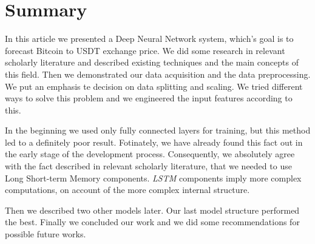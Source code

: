 \documentclass[conference]{IEEEtran}
\begin{document}
\section{Summary}

In this article we presented a Deep Neural Network system, which's goal is to forecast Bitcoin to USDT exchange price. We did some research in relevant scholarly literature and described existing techniques and the main concepts of this field. Then we demonstrated our data acquisition and the data preprocessing. We put an emphasis te decision on data splitting and scaling. We tried different ways to solve this problem and we engineered the input features according to this.

In the beginning we used only fully connected layers for training, but this method led to a definitely poor result. Fotinately, we have already found this fact out in the early stage of the development process. Consequently, we absolutely agree with the fact described in relevant scholarly literature, that we needed to use Long Short-term Memory components. \emph{LSTM} components imply more complex computations, on account of the more complex internal structure.

Then we described two other models later. Our last model structure performed the best. Finally we concluded our work and we did some recommendations for possible future works.

\vspace{20px}
\end{document}
